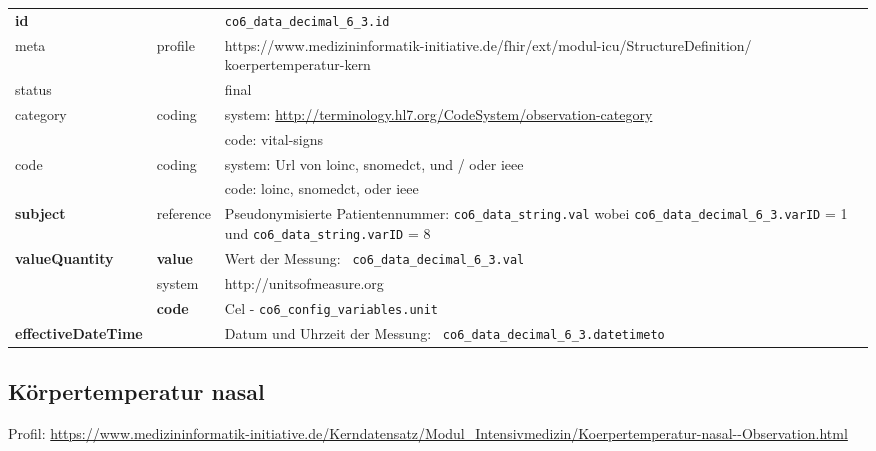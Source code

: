 \begin{longtable}{|l|l|p{7.5cm}|}
	\hline
	\rowcolor{lightgray} \multicolumn{3}{|l|}{Data Mapping (inhaltlich)} \\ \hline
	\textbf{id} &  & \texttt{co6\_data\_decimal\_6\_3.id} \\ \hline
	meta & profile & https://www.medizininformatik-initiative.de/fhir/ext/modul-icu/StructureDefinition/ koerpertemperatur-kern \\ \hline 
	status &  & final   \\ \hline 
	category & coding & system: \url{http://terminology.hl7.org/CodeSystem/observation-category} \\
	\cline{3-3}
	& & code: vital-signs \\ \hline
	code & coding & system: Url von \ac{loinc}, \ac{snomedct}, und / oder \ac{ieee} \\ 
	\cline{3-3} 
	&  & code: \ac{loinc}, \ac{snomedct}, oder \ac{ieee} \\ \hline
	\textbf{subject} & reference & Pseudonymisierte Patientennummer: \texttt{co6\_data\_string.val} wobei \texttt{co6\_data\_decimal\_6\_3.varID} = 1 und \texttt{co6\_data\_string.varID} = 8 \\ \hline
	\textbf{valueQuantity}  & \textbf{value} & Wert der Messung: \texttt{
		co6\_data\_decimal\_6\_3.val} \\
	\cline{2-3}
	& system & http://unitsofmeasure.org \\
	\cline{2-3}
	& \textbf{code} & Cel - \texttt{co6\_config\_variables.unit} \\ \hline
	\textbf{effectiveDateTime}  & & Datum und Uhrzeit der Messung: \texttt{
		co6\_data\_decimal\_6\_3.datetimeto} \\ \hline
\end{longtable}

\subsection{Körpertemperatur nasal} 
Profil: \url{https://www.medizininformatik-initiative.de/Kerndatensatz/Modul_Intensivmedizin/Koerpertemperatur-nasal--Observation.html}

